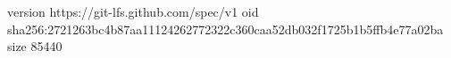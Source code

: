 version https://git-lfs.github.com/spec/v1
oid sha256:2721263bc4b87aa11124262772322c360caa52db032f1725b1b5ffb4e77a02ba
size 85440
